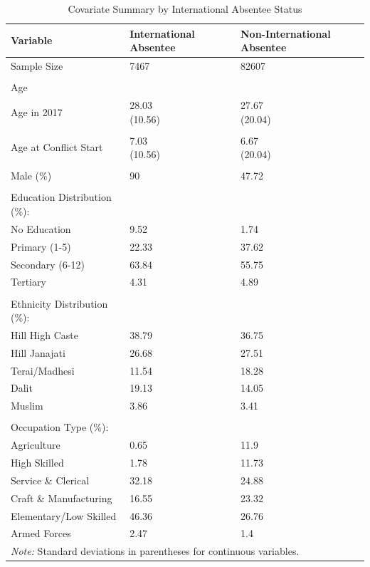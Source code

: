 \begin{table}[!h]
\centering
\caption{\label{tab:intl_absentee_summary}Covariate Summary by International Absentee Status}
\centering
\fontsize{10}{12}\selectfont
\begin{tabular}[t]{lll}
\toprule
Variable & International Absentee & Non-International Absentee\\
\midrule
Sample Size & 7467 & 82607\\
 &  & \\
Age &  & \\
Age in 2017 & \makecell[l]{28.03 \\ (10.56)} & \makecell[l]{27.67 \\ (20.04)}\\
 &  & \\
\addlinespace
Age at Conflict Start & \makecell[l]{7.03 \\ (10.56)} & \makecell[l]{6.67 \\ (20.04)}\\
 &  & \\
Male (\%) & 90 & 47.72\\
 &  & \\
Education Distribution (\%): &  & \\
\addlinespace
No Education & 9.52 & 1.74\\
Primary (1-5) & 22.33 & 37.62\\
Secondary (6-12) & 63.84 & 55.75\\
Tertiary & 4.31 & 4.89\\
 &  & \\
\addlinespace
Ethnicity Distribution (\%): &  & \\
Hill High Caste & 38.79 & 36.75\\
Hill Janajati & 26.68 & 27.51\\
Terai/Madhesi & 11.54 & 18.28\\
Dalit & 19.13 & 14.05\\
\addlinespace
Muslim & 3.86 & 3.41\\
 &  & \\
Occupation Type (\%): &  & \\
Agriculture & 0.65 & 11.9\\
High Skilled & 1.78 & 11.73\\
\addlinespace
Service \& Clerical & 32.18 & 24.88\\
Craft \& Manufacturing & 16.55 & 23.32\\
Elementary/Low Skilled & 46.36 & 26.76\\
Armed Forces & 2.47 & 1.4\\
\bottomrule
\multicolumn{3}{l}{\rule{0pt}{1em}\textit{Note: } Standard deviations in parentheses for continuous variables.}\\
\end{tabular}
\end{table}
